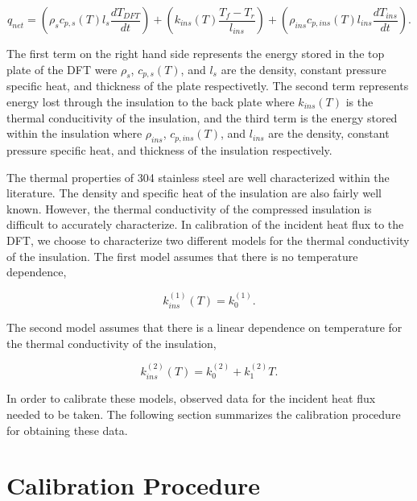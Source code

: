\documentclass[article]{proc}
\begin{document}
    \begin{equation}\label{eq:esm}
        q_{net} = \left(\rho_s c_{p,s}(T) l_s \frac{dT_{DFT}}{dt} \right) + \left( k_{ins}(T) \frac{T_f - T_r}{l_{ins}} \right) + \left(\rho_{ins} c_{p,ins}(T) l_{ins} \frac{dT_{ins}}{dt}\right).
    \end{equation}

    \noindent The first term on the right hand side represents the energy stored in the top plate of the DFT were $\rho_s$, $c_{p,s}(T)$, and $l_s$ are the density, constant pressure specific heat, and thickness of the plate respectivetly. The second term represents energy lost through the insulation to the back plate where $k_{ins}(T)$ is the thermal conducitivity of the insulation, and the third term is the energy stored within the insulation where $\rho_{ins}$, $c_{p,ins}(T)$, and $l_{ins}$ are the density, constant pressure specific heat, and thickness of the insulation respectively. 

    The thermal properties of 304 stainless steel are well characterized within the literature. The density and specific heat of the insulation are also fairly well known. However, the thermal conductivity of the compressed insulation is difficult to accurately characterize. In calibration of the incident heat flux to the DFT, we choose to characterize two different models for the thermal conductivity of the insulation. The first model assumes that there is no temperature dependence,

    \begin{equation}\label{eq:k_ins_1}
        k_{ins}^{(1)}(T) = k_0^{(1)}.
    \end{equation}

    \noindent The second model assumes that there is a linear dependence on temperature for the thermal conductivity of the insulation,

    \begin{equation}\label{eq:k_ins_2}
        k_{ins}^{(2)}(T) = k^{(2)}_0 + k^{(2)}_1 T.
    \end{equation}

    In order to calibrate these models, observed data for the incident heat flux needed to be taken. The following section summarizes the calibration procedure for obtaining these data.
    
\section{Calibration Procedure}
\end{document}

